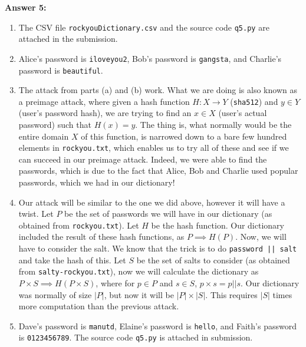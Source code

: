 \documentclass[12pt,reqno]{amsart}
\newcommand{\code}[1]{\texttt{#1}}
\begin{document}
\textbf{Answer 5:}
\begin{enumerate}[label=\alph*.]
	\item The CSV file \code{rockyouDictionary.csv} and the source code \code{q5.py} are attached in the submission.
	\item Alice's password is \code{iloveyou2}, Bob's password is \code{gangsta}, and Charlie's password is \code{beautiful}.
	\item The attack from parts (a) and (b) work. What we are doing is also known as a preimage attack, where given a hash function $H : X \xrightarrow{} Y$ (\code{sha512}) and $y \in Y$ (user's password hash), we are trying to find an $x \in X$ (user's actual password) such that $H(x)=y$. The thing is, what normally would be the entire domain $X$ of this function, is narrowed down to a bare few hundred elements in \code{rockyou.txt}, which enables us to try all of these and see if we can succeed in our preimage attack. Indeed, we were able to find the passwords, which is due to the fact that Alice, Bob and Charlie used popular passwords, which we had in our dictionary!
	\item Our attack will be similar to the one we did above, however it will have a twist. Let $P$ be the set of passwords we will have in our dictionary (as obtained from \code{rockyou.txt}). Let $H$ be the hash function. Our dictionary included the result of these hash functions, as $P \implies H(P)$. Now, we will have to consider the salt. We know that the trick is to do \code{password || salt} and take the hash of this. Let $S$ be the set of salts to consider (as obtained from \code{salty-rockyou.txt}), now we will calculate the dictionary as $P \times S \implies H(P \times S)$, where for $p \in P$ and $s \in S$, $p \times s = p || s$. Our dictionary was normally of size $|P|$, but now it will be $|P|\times|S|$. This requires $|S|$ times more computation than the previous attack.
	\item Dave's password is \code{manutd}, Elaine's password is \code{hello}, and Faith's password is \code{0123456789}. The source code \code{q5.py} is attached in submission.
\end{enumerate}


\vspace{20px}
\end{document}
